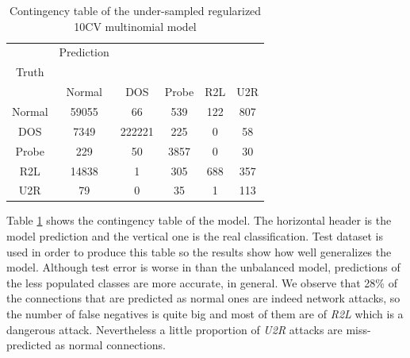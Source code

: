 \documentclass[a4paper]{article} %
\begin{document}
\begin{table}[H]
	\centering
	\begin{tabular}{c | c c c c c}
			& Prediction\\
		Truth\\
				& Normal & DOS & Probe & R2L & U2R \\
		\hline
		Normal	& 59055	& 66 	 & 539	 & 122 	& 807 \\
		DOS		& 7349	& 222221 & 225	 & 0  	& 58\\
		Probe	& 229	& 50	 & 3857	 & 0	& 30 \\
		R2L		& 14838	& 1		 & 305   & 688 	& 357\\
		U2R		& 79	& 0		 & 35    & 1 	& 113\\	
	\end{tabular}
	\caption{Contingency table of the under-sampled regularized 10CV multinomial model}
	\label{table:sub10model}
\end{table}

Table \ref{table:sub10model} shows the contingency table of the model. The horizontal header is the model prediction and the vertical one is the real classification. Test dataset is used in order to produce this table so the results show how well generalizes the model. Although test error is worse in than the unbalanced model, predictions of the less populated classes are more accurate, in general. We observe that 28\% of the connections that are predicted as normal ones are indeed network attacks, so the number of false negatives is quite big and most of them are of \textit{R2L} which is a dangerous attack. Nevertheless a little proportion of \textit{U2R} attacks are miss-predicted as normal connections. 



\nocite{*}
\printbibliography

\end{document}
